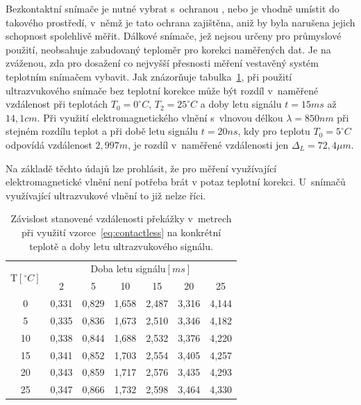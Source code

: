             Bezkontaktní snímače je nutné vybrat s~ochranou , nebo je vhodně umístit do takového prostředí, v~němž je tato ochrana zajištěna, aniž by byla narušena jejich schopnost spolehlivě měřit. Dálkové snímače, jež nejsou určeny pro průmyslové použití, neobsahuje zabudovaný teploměr pro korekci naměřených dat. Je na zváženou, zda pro dosažení co nejvyšší přesnosti měření vestavěný systém teplotním snímačem vybavit. Jak znázorňuje tabulka~\ref{table:compare}, při použití ultrazvukového snímače bez teplotní korekce může být rozdíl v~naměřené vzdálenost při teplotách $T_0=0^\circ\unit{C}$, $T_2=25^\circ\unit{C}$ a doby letu signálu $t=15\unit{ms}$ až $14,1\unit{cm}$. Při využití elektromagnetického vlnění s~vlnovou délkou $\lambda=850\unit{nm}$ při stejném rozdílu teplot a při době letu signálu $t=20\unit{ns}$, kdy pro teplotu $T_0=5^\circ\unit{C}$ odpovídá vzdálenost $2,997\unit{m}$, je rozdíl v~naměřené vzdálenosti jen $\Delta_L = 72,4\unit{\mu m}$.

            Na základě těchto údajů lze prohlásit, že pro měření využívající elektromagnetické vlnění není potřeba brát v potaz teplotní korekci. U~snímačů využívající ultrazvukové vlnění to již nelze říci.

            \begin{table}[h]\centering
                \begin{tabular}{@{}ccccccc@{}}
                    \toprule
                    \multirow{2}{*}{\phantom{a}T$\unit{[^\circ C]}$\phantom{a}}& \multicolumn{6}{c}{Doba letu signálu$\unit{[ms]}$}\\
                    \cmidrule{2-7}
                        &   2       &   5       &   10      &   15      &   20      & 25\\
                    \midrule
                    0   &   0,331   &   0,829   &   1,658   &   2,487   &   3,316   & 4,144\\
                    5   &   0,335   &   0,836   &   1,673   &   2,510   &   3,346   & 4,182\\
                    10  &   0,338   &   0,844   &   1,688   &   2,532   &   3,376   & 4,220\\
                    15  &   0,341   &   0,852   &   1,703   &   2,554   &   3,405   & 4,257\\
                    20  &   0,343   &   0,859   &   1,717   &   2,576   &   3,435   & 4,293\\
                    25  &   0,347   &   0,866   &   1,732   &   2,598   &   3,464   & 4,330\\
                    \bottomrule
                \end{tabular}
                \caption{Závislost stanovené vzdálenosti překážky v~metrech při využití vzorce~\ref{eq:contactless} na konkrétní teplotě a doby letu ultrazvukového signálu.}
                \label{table:compare}
            \end{table}

